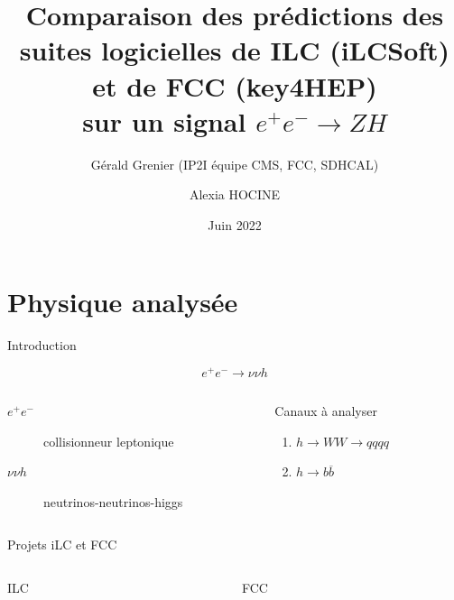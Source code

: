 \documentclass[9pt]{beamer}
\author[Hocine]{Alexia HOCINE}
\title{
	Comparaison des prédictions des suites logicielles de ILC (iLCSoft) et de FCC (key4HEP) \\
	sur un signal $ e^{+} e^{-} \longrightarrow Z H $ 
}
\subtitle{Gérald Grenier (IP2I équipe CMS, FCC, SDHCAL)}
\institute[UCBL]{Université de Claude Bernard Lyon 1}
\date[2022]{Juin 2022}
\newcommand{\bbar}{\overline{b}}
\begin{document}

\begin{frame}
	\titlepage
\end{frame}

\section{Physique analysée}

\begin{frame}{Introduction}

	$$ e^{+} e^{-} \longrightarrow \nu \nu h $$

	\begin{columns}
		
		\begin{column}{0.55\textwidth}
			\begin{description}
				\item[$e^{+} e^{-}$] collisionneur leptonique
				\item[$\nu \nu h$] neutrinos-neutrinos-higgs
			\end{description}
		\end{column}
		
		\begin{column}{0.4\textwidth}
			\begin{block}{Canaux à analyser}
				\begin{enumerate}
					\item $h \longrightarrow WW \longrightarrow qqqq$
					\item $h \longrightarrow b\bbar$
				\end{enumerate}
			\end{block}
		\end{column}
	\end{columns}

\end{frame}


\begin{frame}{Projets iLC et FCC}

	\begin{columns}
		
		\begin{column}{0.45\textwidth}
			\begin{block}{ILC}

			\end{block}
		\end{column}
		
		\begin{column}{0.45\textwidth}
			\begin{block}{FCC}

			\end{block}
		\end{column}
	\end{columns}

\end{frame}
\end{document}
